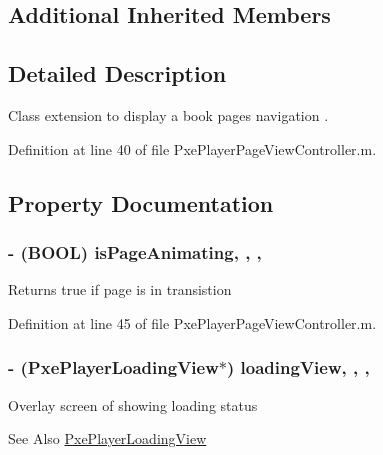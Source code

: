\subsection*{Additional Inherited Members}


\subsection{Detailed Description}
Class extension to display a book pages navigation . 

Definition at line 40 of file Pxe\-Player\-Page\-View\-Controller.\-m.



\subsection{Property Documentation}
\hypertarget{category_pxe_player_page_view_controller_07_08_af365be45f0c1dee605f424d149e23bbe}{
\subsubsection[{is\-Page\-Animating}]{\setlength{\rightskip}{0pt plus 5cm}-\/ (B\-O\-O\-L) is\-Page\-Animating\hspace{0.3cm}{\ttfamily [read]}, {\ttfamily [write]}, {\ttfamily [nonatomic]}, {\ttfamily [assign]}}}\label{category_pxe_player_page_view_controller_07_08_af365be45f0c1dee605f424d149e23bbe}
Returns true if page is in transistion 

Definition at line 45 of file Pxe\-Player\-Page\-View\-Controller.\-m.

\hypertarget{category_pxe_player_page_view_controller_07_08_a52b8cccbb0b8acb9ae499f77281c65fd}{
\subsubsection[{loading\-View}]{\setlength{\rightskip}{0pt plus 5cm}-\/ ({\bf Pxe\-Player\-Loading\-View}$\ast$) loading\-View\hspace{0.3cm}{\ttfamily [read]}, {\ttfamily [write]}, {\ttfamily [nonatomic]}, {\ttfamily [strong]}}}\label{category_pxe_player_page_view_controller_07_08_a52b8cccbb0b8acb9ae499f77281c65fd}
Overlay screen of showing loading status \begin{DoxySeeAlso}{See Also}
\hyperlink{interface_pxe_player_loading_view}{Pxe\-Player\-Loading\-View} 
\end{DoxySeeAlso}


